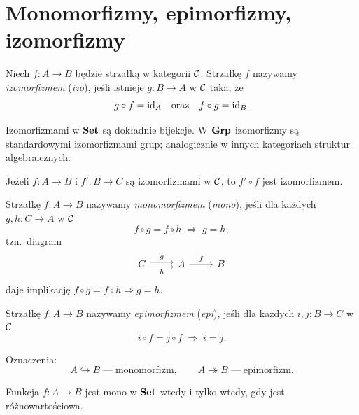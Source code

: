 \section{Monomorfizmy, epimorfizmy, izomorfizmy}

\begin{definicja}
Niech $f\colon A\to B$ będzie strzałką w kategorii $\mathcal{C}$. Strzałkę $f$ nazywamy \emph{izomorfizmem} (\emph{izo}), jeśli istnieje $g\colon B\to A$ w $\mathcal{C}$ taka, że
\[
g\circ f = \mathrm{id}_A \quad\text{oraz}\quad f\circ g = \mathrm{id}_B.
\]
\end{definicja}

\begin{przyklad}
Izomorfizmami w $\mathbf{Set}$ są dokładnie bijekcje. W $\mathbf{Grp}$ izomorfizmy są standardowymi izomorfizmami grup; analogicznie w innych kategoriach struktur algebraicznych.
\end{przyklad}

\begin{twierdzenie}
Jeżeli $f\colon A\to B$ i $f'\colon B\to C$ są izomorfizmami w $\mathcal{C}$, to $f'\circ f$ jest izomorfizmem.
\end{twierdzenie}

\begin{definicja}
Strzałkę $f\colon A\to B$ nazywamy \emph{monomorfizmem} (\emph{mono}), jeśli dla każdych $g,h\colon C\to A$ w $\mathcal{C}$
\[
f\circ g = f\circ h \;\Longrightarrow\; g=h,
\]
tzn.\ diagram
\[
\begin{tikzcd}
C \arrow[r, shift left, "g"] \arrow[r, shift right, "h"'] & A \arrow[r, "f"] & B
\end{tikzcd}
\]
daje implikację $f\circ g = f\circ h \Rightarrow g=h$.
\end{definicja}

\begin{definicja}
Strzałkę $f\colon A\to B$ nazywamy \emph{epimorfizmem} (\emph{epi}), jeśli dla każdych $i,j\colon B\to C$ w $\mathcal{C}$
\[
i\circ f = j\circ f \;\Longrightarrow\; i=j.
\]
\end{definicja}

\begin{uwaga}
Oznaczenia:
\[
A \hookrightarrow B \;\text{---}\; \text{monomorfizm}, \qquad A \twoheadrightarrow B \;\text{---}\; \text{epimorfizm}.
\]
\end{uwaga}

\begin{stwierdzenie}
Funkcja $f\colon A\to B$ jest mono w $\mathbf{Set}$ wtedy i tylko wtedy, gdy jest różnowartościowa.
\end{stwierdzenie}

